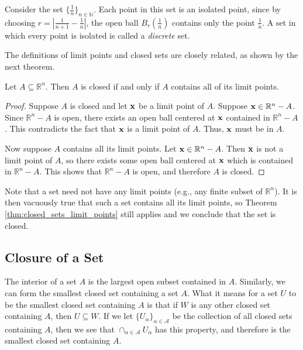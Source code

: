 \documentclass[12pt,letterpaper,reqno]{article}
\numberwithin{equation}{section}
\newcommand{\R}{\ensuremath{\mathbb R}}
\newcommand{\N}{{\mathbb N}}
\newcommand{\bx}{{\bf x}}
\begin{document}
{\begin{example}
Consider the set $\{\frac{1}{n}\}_{n \in \N}$. Each point in this set is an isolated point, since by choosing $r=|\frac{1}{n+1}-\frac{1}{n}|$, the open ball $B_r(\frac{1}{n})$ contains only the point $\frac{1}{n}$. A set in which every point is isolated is called a \emph{discrete} set.	
\end{example}


The definitions of limit points and closed sets are closely related, as shown by the next theorem.

\begin{thm}\label{thm:closed_sets_limit_points}
Let $A \subseteq \R^n$. Then $A$ is closed if and only if $A$ contains all of its limit points.	
\end{thm}

\begin{proof}
	Suppose $A$ is closed and let $\bx$ be a limit point of $A$. Suppose $\bx \in \R^n-A$. Since $\R^n-A$ is open, there exists an open ball centered at $\bx$ contained in $\R^n-A$. This contradicts the fact that $\bx$ is a limit point of $A$. Thus, $\bx$ must be in $A$.
	
	Now suppose $A$ contains all its limit points. Let $\bx \in \R^n-A$. Then $\bx$ is not a limit point of $A$, so there exists some open ball centered at $\bx$ which is contained in $\R^n-A$. This shows that $\R^n-A$ is open, and therefore $A$ is closed. 
\end{proof}

Note that a set need not have any limit points (e.g., any finite subset of $\R^n$). It is then vacuously true that such a set contains all its limit points, so Theorem \ref{thm:closed_sets_limit_points} still applies and we conclude that the set is closed. 

\subsection{Closure of a Set}
The interior of a set $A$ is the largest open subset contained in $A$. Similarly, we can form the smallest closed set containing a set $A$. What it means for a set $U$ to be the smallest closed set containing $A$ is that if $W$ is any other closed set containing $A$, then $U \subseteq W$. If we let $\{U_\alpha\}_{\alpha \in \mathscr{A}}$ be the collection of all closed sets containing $A$, then we see that $\cap_{\alpha \in \mathscr{A}} U_\alpha$ has this property, and therefore is the smallest closed set containing $A$.

}
\end{document}
